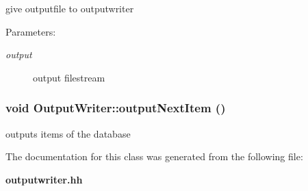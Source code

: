 give outputfile to outputwriter \begin{Desc}
\item[Parameters:]
\begin{description}
\item[{\em output}]output filestream \end{description}
\end{Desc}
\subsubsection[outputNextItem]{\setlength{\rightskip}{0pt plus 5cm}void OutputWriter::outputNextItem ()\hspace{0.3cm}{\tt  [protected]}}\label{classOutputWriter_c3a96d5b72dd7db1c832fa8b0ec4c746}


outputs items of the database 

The documentation for this class was generated from the following file:\begin{CompactItemize}
\item 
{\bf outputwriter.hh}\end{CompactItemize}
